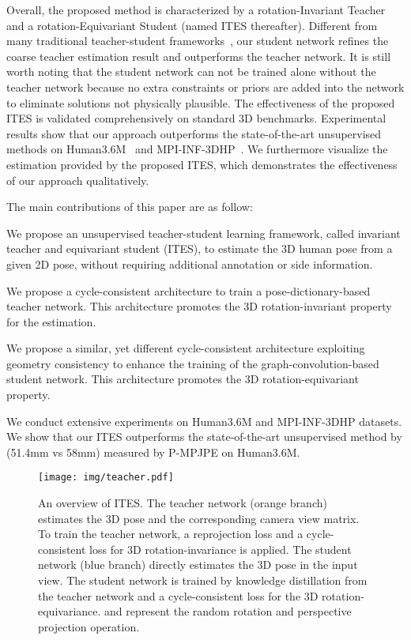 \documentclass[letterpaper]{article} \usepackage{aaai21}  \usepackage{times}  \usepackage{helvet} \usepackage{courier}  \usepackage[hyphens]{url}  \usepackage{graphicx} \urlstyle{rm} \def\UrlFont{\rm}  \usepackage{natbib}  \usepackage{caption} \frenchspacing  \setlength{\pdfpagewidth}{8.5in}  \setlength{\pdfpageheight}{11in}
\begin{document}
Overall, the proposed method is characterized by a rotation-Invariant Teacher and a rotation-Equivariant Student (named ITES thereafter). Different from many traditional teacher-student frameworks~\cite{zhou2017rocket}, our student network refines the coarse teacher estimation result and outperforms the teacher network. It is still worth noting that the student network can not be trained alone without the teacher network because no extra constraints or priors are added into the network to eliminate solutions not physically plausible. The effectiveness of the proposed ITES is validated comprehensively on standard 3D benchmarks. Experimental results show that our approach outperforms the state-of-the-art unsupervised methods on Human3.6M~\cite{ionescu2013human3} and MPI-INF-3DHP~\cite{mehta2017monocular}. We furthermore visualize the estimation provided by the proposed ITES, which demonstrates the effectiveness of our approach qualitatively. 


The main contributions of this paper are as follow:

 We propose an unsupervised teacher-student learning framework, called invariant teacher and equivariant student (ITES), to estimate the 3D human pose from a given 2D pose, without requiring additional annotation or side information.

 We propose a cycle-consistent architecture to train a pose-dictionary-based teacher network. This architecture promotes the 3D rotation-invariant property for the estimation.

 We propose a similar, yet different cycle-consistent architecture exploiting geometry consistency to enhance the training of the graph-convolution-based student network. This architecture promotes the 3D rotation-equivariant property.

 We conduct extensive experiments on Human3.6M and MPI-INF-3DHP datasets. We show that our ITES outperforms the state-of-the-art unsupervised method by  (51.4mm vs 58mm) measured by P-MPJPE on Human3.6M.

\begin{figure*}[t] 
\centering
\texttt{[image: img/teacher.pdf]}
\vspace{-3mm}
\caption{\small An overview of ITES. The teacher network (orange branch) estimates the 3D pose and the corresponding camera view matrix. To train the teacher network, a reprojection loss and a cycle-consistent loss for 3D rotation-invariance is applied. The student network (blue branch) directly estimates the 3D pose in the input view. The student network is trained by knowledge distillation from the teacher network and a cycle-consistent loss for the 3D rotation-equivariance.  and  represent the random rotation and perspective projection operation.}
\label{fig:teacher_student}
\vspace{-3mm}
\end{figure*}
\end{document}
